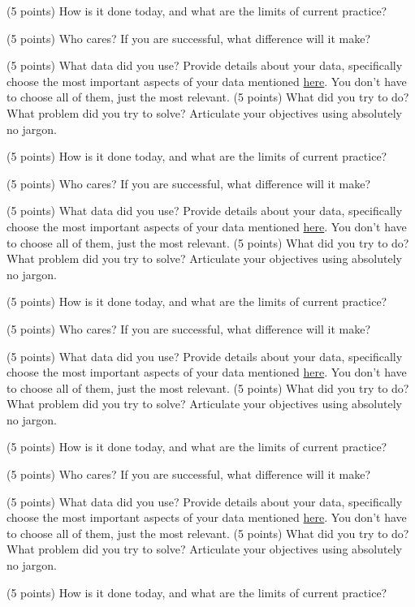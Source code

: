 \documentclass[10pt,twocolumn,letterpaper]{article}
\begin{document}
(5 points) How is it done today, and what are the limits of current practice?

(5 points) Who cares? If you are successful, what difference will it make? 

(5 points) What data did you use? Provide details about your data, specifically choose the most important aspects of your data mentioned \href{https://arxiv.org/abs/1803.09010}{here}. You don’t have to choose all of them, just the most relevant.
(5 points) What did you try to do? What problem did you try to solve? Articulate your objectives using absolutely no jargon. 

(5 points) How is it done today, and what are the limits of current practice?

(5 points) Who cares? If you are successful, what difference will it make? 

(5 points) What data did you use? Provide details about your data, specifically choose the most important aspects of your data mentioned \href{https://arxiv.org/abs/1803.09010}{here}. You don’t have to choose all of them, just the most relevant.
(5 points) What did you try to do? What problem did you try to solve? Articulate your objectives using absolutely no jargon. 

(5 points) How is it done today, and what are the limits of current practice?

(5 points) Who cares? If you are successful, what difference will it make? 

(5 points) What data did you use? Provide details about your data, specifically choose the most important aspects of your data mentioned \href{https://arxiv.org/abs/1803.09010}{here}. You don’t have to choose all of them, just the most relevant.
(5 points) What did you try to do? What problem did you try to solve? Articulate your objectives using absolutely no jargon. 

(5 points) How is it done today, and what are the limits of current practice?

(5 points) Who cares? If you are successful, what difference will it make? 

(5 points) What data did you use? Provide details about your data, specifically choose the most important aspects of your data mentioned \href{https://arxiv.org/abs/1803.09010}{here}. You don’t have to choose all of them, just the most relevant.
(5 points) What did you try to do? What problem did you try to solve? Articulate your objectives using absolutely no jargon. 

(5 points) How is it done today, and what are the limits of current practice?
\end{document}
